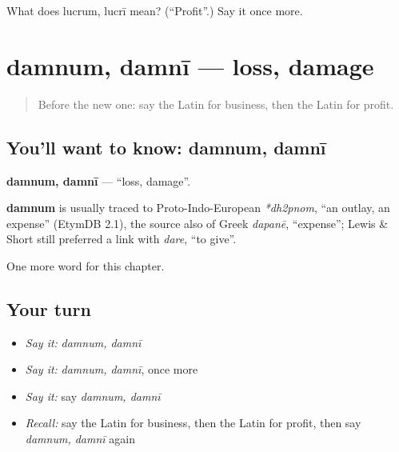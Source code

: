 \begin{tcolorbox}[breakable,colback=teal!4,colframe=teal!35!black,title={Before you move on}]
What does lucrum, lucrī mean? (\textquotedblleft{}Profit\textquotedblright{}.) Say it once more.
\end{tcolorbox}
\section[damnum, damnī]{damnum, damnī — loss, damage}

\label{lesson:LA-C274-damnum}



\begin{quote}
Before the new one: say the Latin for business, then the Latin for profit.
\end{quote}

\subsection*{You'll want to know: damnum, damnī}
\textbf{damnum, damnī} — \textquotedblleft{}loss, damage\textquotedblright{}.

\begin{cousinweb}
\textbf{damnum} is usually traced to Proto-Indo-European \emph{*dh2pnom}, \textquotedblleft{}an outlay, an expense\textquotedblright{} (EtymDB 2.1), the source also of Greek \emph{dapanē}, \textquotedblleft{}expense\textquotedblright{}; Lewis \& Short still preferred a link with \emph{dare}, \textquotedblleft{}to give\textquotedblright{}.
\end{cousinweb}

\begin{grammarlens}[title={What you've built}]
One more word for this chapter.
\end{grammarlens}

\subsection*{Your turn}
\begin{itemize}
\raggedright
  \item \emph{Say it:} \emph{damnum, damnī}
  \item \emph{Say it:} \emph{damnum, damnī}, once more
  \item \emph{Say it:} say \emph{damnum, damnī}
  \item \emph{Recall:} say the Latin for business, then the Latin for profit, then say \emph{damnum, damnī} again
\end{itemize}

